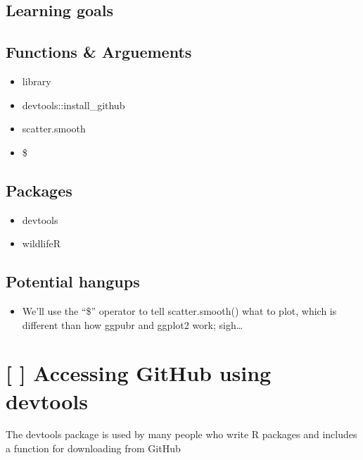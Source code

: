 \documentclass[
]{book}
\providecommand{\tightlist}{%
  \setlength{\itemsep}{0pt}\setlength{\parskip}{0pt}}
\begin{document}
\hypertarget{learning-goals}{%
\subsection{Learning goals}\label{learning-goals}}

\hypertarget{functions-arguements-1}{%
\subsection{Functions \& Arguements}\label{functions-arguements-1}}

\begin{itemize}
\tightlist
\item
  library
\item
  devtools::install\_github
\item
  scatter.smooth
\item
  \$
\end{itemize}

\hypertarget{packages}{%
\subsection{Packages}\label{packages}}

\begin{itemize}
\tightlist
\item
  devtools
\item
  wildlifeR
\end{itemize}

\hypertarget{potential-hangups}{%
\subsection{Potential hangups}\label{potential-hangups}}

\begin{itemize}
\tightlist
\item
  We'll use the ``\$'' operator to tell scatter.smooth() what to plot, which is different than how ggpubr and ggplot2 work; sigh\ldots{}
\end{itemize}

\hypertarget{accessing-github-using-devtools}{%
\section{{[} {]} Accessing GitHub using devtools}\label{accessing-github-using-devtools}}

The devtools package is used by many people who write R packages and includes a function for downloading from GitHub
\end{document}
